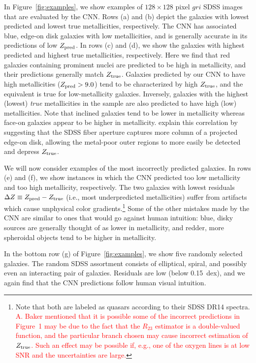 \documentclass[fleqn,usenatbib]{mnras}
\newcommand{\editorial}[1]{\textcolor{red}{#1}}
\begin{document}
In Figure~\ref{fig:examples}, we show examples of $128 \times 128$ pixel $gri$ SDSS images that are evaluated by the CNN.
Rows (a) and (b) depict the galaxies with lowest predicted and lowest true metallicities, respectively.
The CNN has associated blue, edge-on disk galaxies with low metallicities, and is generally accurate in its predictions of low $Z_{\rm pred}$.
In rows (c) and (d), we show the galaxies with highest predicted and highest true metallicities, respectively.
Here we find that red galaxies containing prominent nuclei are predicted to be high in metallicity, and their predictions generally match $Z_{\rm true}$.
Galaxies predicted by our CNN to have high metallicities ($Z_{\rm pred} > 9.0$) tend to be characterized by high $Z_{\rm true}$, and the equivalent is true for low-metallicity galaxies.
Inversely, galaxies with the highest (lowest) \textit{true} metallicities in the sample are also predicted to have high (low) metallicities.
Note that inclined galaxies tend to be lower in metallicity whereas face-on galaxies appear to be higher in metallicity.
\cite{2004ApJ...613..898T} explain this correlation by suggesting that the SDSS fiber aperture captures more column of a projected edge-on disk, allowing the metal-poor outer regions to more easily be detected and depress $Z_{\rm true}$.

We will now consider examples of the most incorrectly predicted galaxies.
In rows (e) and (f), we show instances in which the CNN predicted too low metallicity and too high metallicity, respectively.
The two galaxies with lowest residuals $\Delta Z \equiv Z_{\rm pred} - Z_{\rm true}$ (i.e., most underpredicted metallicities) suffer from artifacts which cause unphysical color gradients.\footnote{Note that both are labeled as quasars according to their SDSS DR14 spectra. \editorial{A. Baker mentioned that it is possible some of the incorrect predictions in Figure~1 may be due to the fact that the $R_{23}$ estimator is a double-valued function, and the particular branch chosen may cause incorrect estimation of $Z_{\rm true}$. Such an effect may be possible if, e.g., one of the oxygen lines is at low SNR and the uncertainties are large.}}
Some of the other mistakes made by the CNN are similar to ones that would go against human intuition: blue, disky sources are generally thought of as lower in metallicity, and redder, more spheroidal objects tend to be higher in metallicity.

In the bottom row (g) of Figure~\ref{fig:examples}, we show five randomly selected galaxies.
The random SDSS assortment consists of elliptical, spiral, and possibly even an interacting pair of galaxies.
Residuals are low (below 0.15~dex), and we again find that the CNN predictions follow human visual intuition.
\end{document}
